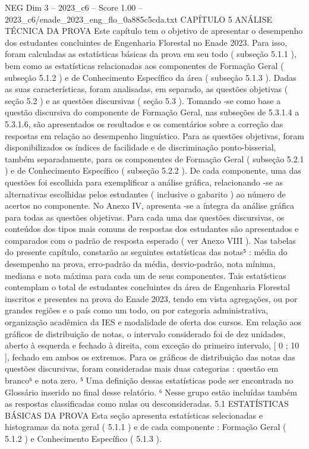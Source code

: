 \begin{textsample}{NEG Dim 3 – 2023\_c6 – Score 1.00 – 2023\_c6/enade\_2023\_eng\_flo\_0a885c5cda.txt}  \label{ex:f3_neg_183}
CAPÍTULO 5 ANÁLISE TÉCNICA DA PROVA Este capítulo tem o objetivo de apresentar o desempenho dos estudantes concluintes de Engenharia Florestal no Enade 2023.
Para isso, foram calculadas as estatísticas básicas da prova em seu todo ( subseção 5.1.1 ), bem como as estatísticas relacionadas aos componentes de Formação Geral ( subseção 5.1.2 ) e de Conhecimento Específico da área ( subseção 5.1.3 ).
Dadas as suas características, foram analisadas, em separado, as questões objetivas ( seção 5.2 ) e as questões discursivas ( seção 5.3 ).
Tomando -se como base a questão discursiva do componente de Formação Geral, nas subseções de 5.3.1.4 a 5.3.1.6, são apresentados os resultados e os comentários sobre a correção das respostas em relação ao desempenho linguístico.
Para as questões objetivas, foram disponibilizados os índices de facilidade e de discriminação ponto-bisserial, também separadamente, para os componentes de Formação Geral ( subseção 5.2.1 ) e de Conhecimento Específico ( subseção 5.2.2 ).
De cada componente, uma das questões foi escolhida para exemplificar a análise gráfica, relacionando -se as alternativas escolhidas pelos estudantes ( inclusive o gabarito ) ao número de acertos no componente.
No Anexo IV, apresenta -se a íntegra da análise gráfica para todas as questões objetivas.
Para cada uma das questões discursivas, os conteúdos dos tipos mais comuns de respostas dos estudantes são apresentados e comparados com o padrão de resposta esperado ( ver Anexo VIII ).
Nas tabelas do presente capítulo, constarão as seguintes estatísticas das notas⁵ : média do desempenho na prova, erro-padrão da média, desvio-padrão, nota mínima, mediana e nota máxima para cada um de seus componentes.
Tais estatísticas contemplam o total de estudantes concluintes da área de Engenharia Florestal inscritos e presentes na prova do Enade 2023, tendo em vista agregações, ou por grandes regiões e o país como um todo, ou por categoria administrativa, organização acadêmica da IES e modalidade de oferta dos cursos.
Em relação aos gráficos de distribuição de notas, o intervalo considerado foi de dez unidades, aberto à esquerda e fechado à direita, com exceção do primeiro intervalo, [ 0 ; 10 ], fechado em ambos os extremos.
Para os gráficos de distribuição das notas das questões discursivas, foram consideradas mais duas categorias : questão em branco⁶ e nota zero. ⁵ Uma definição dessas estatísticas pode ser encontrada no Glossário inserido no final desse relatório. ⁶ Nesse grupo estão incluídas também as respostas classificadas como nulas ou desconsideradas. 5.1 ESTATÍSTICAS BÁSICAS DA PROVA Esta seção apresenta estatísticas selecionadas e histogramas da nota geral ( 5.1.1 ) e de cada componente : Formação Geral ( 5.1.2 ) e Conhecimento Específico ( 5.1.3 ).

\end{textsample}
